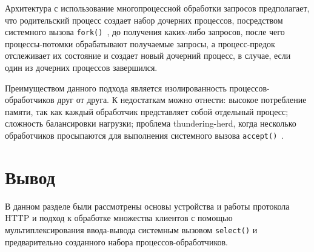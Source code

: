 Архитектура с использование многопроцессной обработки запросов предполагает, что родительский процесс создает набор дочерних процессов, посредством системного вызова \texttt{fork()}~\cite{linux_fork}, до получения каких-либо запросов, после чего процессы-потомки обрабатывают получаемые запросы, а процесс-предок отслеживает их состояние и создает новый дочерний процесс, в случае, если один из дочерних процессов завершился.

Преимуществом данного подхода является изолированность процессов-обработчиков друг от друга. К недостаткам можно отнести: высокое потребление памяти, так как каждый обработчик представляет собой отдельный процесс; сложность балансировки нагрузки; проблема thundering-herd, когда несколько обработчиков просыпаются для выполнения системного вызова \texttt{accept()}~\cite{linux_accept}.


\section*{Вывод}

В данном разделе были рассмотрены основы устройства и работы протокола HTTP и подход к обработке множества клиентов с помощью мультиплексирования ввода-вывода системным вызовом \texttt{select()} и предварительно созданного набора процессов-обработчиков.

\clearpage
